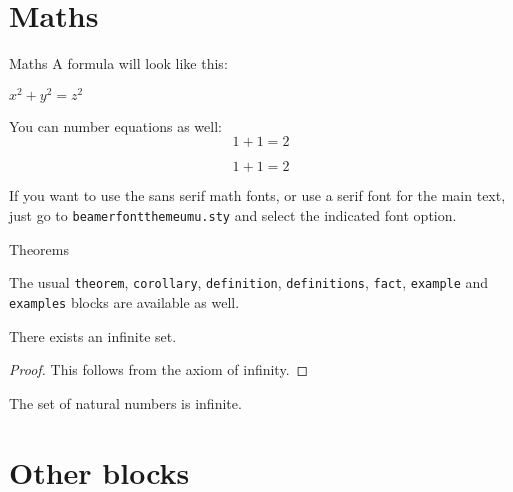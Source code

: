 \documentclass[usenames,dvipsnames,10pt]{beamer}
\begin{document}
\section{Maths}

\begin{frame}{Maths}
A formula will look like this: 
\begin{center}
 $x^2 + y^2 = z^2$
\end{center}

You can number equations as well:
\begin{equation}
1+1=2
\end{equation}

\begin{equation}
1+1=2 \tag{custom label!}
\end{equation}

\vskip 0.5cm

If you want to use the sans serif math fonts, or use a serif font for the main text, just go to \texttt{beamerfontthemeumu.sty} and select the indicated font option. 

\end{frame}

\begin{frame}{Theorems}

The usual \texttt{theorem}, \texttt{corollary}, \texttt{definition}, \texttt{definitions}, \texttt{fact}, \texttt{example} and \texttt{examples} blocks are available as well.

\begin{theorem}
There exists an infinite set.
\end{theorem}
\begin{proof}
This follows from the axiom of infinity.
\end{proof}
\begin{example}
The set of natural numbers is infinite. 
\end{example}

\end{frame}

\section{Other blocks}
\end{document}

